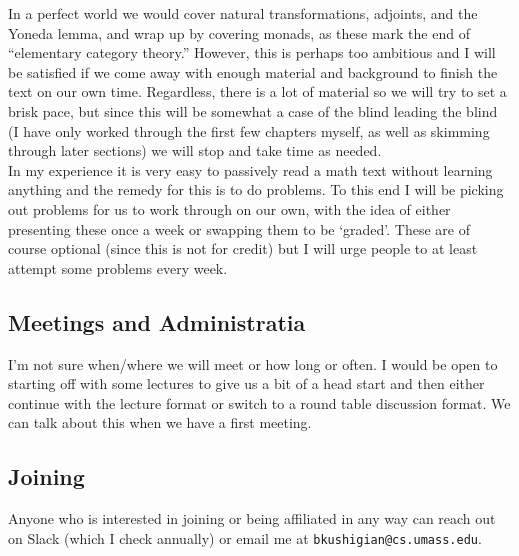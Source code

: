 In a perfect world we would cover natural transformations, adjoints, and  the
Yoneda lemma, and wrap up by covering monads, as these mark the end of
``elementary category theory.'' However, this is perhaps too ambitious and I
will be satisfied if we come away with enough material and background to finish
the text on our own time. Regardless, there is a lot of material so we will try
to set a brisk pace, but since this will be somewhat a case of the blind leading
the blind (I have only worked through the first few chapters myself, as well as
skimming through later sections) we will stop and take time as needed.\\

In my experience it is very easy to passively read a math text without learning
anything and the remedy for this is to do problems. To this end I will be
picking out problems for us to work through on our own, with the idea of either
presenting these once a week or swapping them to be `graded'. These are of
course optional (since this is not for credit) but I will urge people to at
least attempt some problems every week.\\

\subsection*{Meetings and Administratia}
I'm not sure when/where we will meet or how long or often. I would be open to
starting off with some lectures to give us a bit of a head start and then either
continue with the lecture format or switch to a round table discussion format.
We can talk about this when we have a first meeting.\\

\subsection*{Joining}
Anyone who is interested in joining or being affiliated in any way can reach out
on Slack (which I check annually) or email me at
\texttt{bkushigian@cs.umass.edu}.


